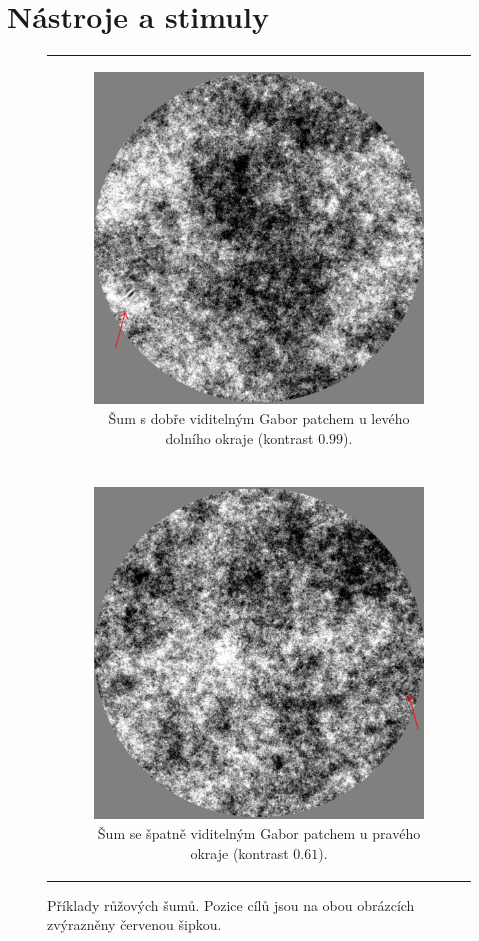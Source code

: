 \section{Nástroje a stimuly}
\begin{figure}
\centering
\begin{tabular}{c}
\begin{subfigure}{0.95\textwidth}
\centering
\includegraphics[width = .75\linewidth]{img/noise_visible}
\caption{Šum s dobře viditelným Gabor patchem u levého dolního okraje (kontrast $0.99$).}
\end{subfigure}\\
\noalign{\vskip\bigskipamount}
\\
\begin{subfigure}{0.95\textwidth}
\centering
\includegraphics[width = .75\linewidth]{img/noise_invisible}
\caption{Šum se špatně viditelným Gabor patchem u pravého okraje (kontrast $0.61$).}
\end{subfigure}
\end{tabular}
\caption{Příklady růžových šumů. Pozice cílů jsou na obou obrázcích zvýrazněny červenou šipkou.}
\label{Sumy}
\end{figure}

